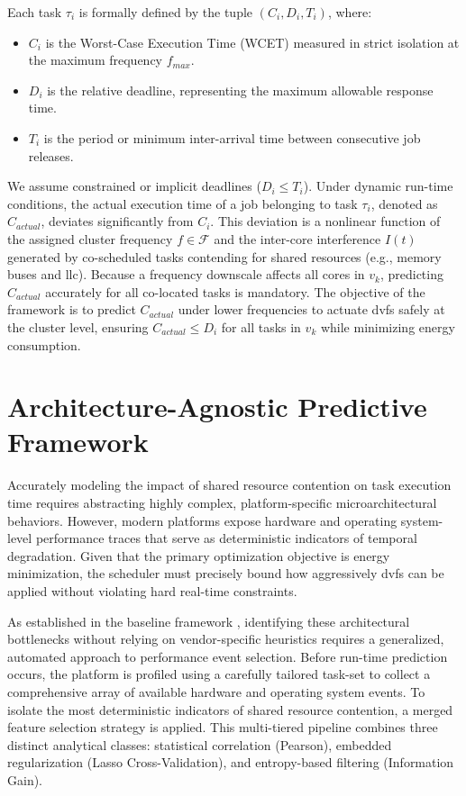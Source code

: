 \documentclass[conference]{IEEEtran}
\begin{document}
Each task $\tau_i$ is formally defined by the tuple $(C_i, D_i, T_i)$, where:
\begin{itemize}
    \item $C_i$ is the Worst-Case Execution Time (WCET) measured in strict isolation at the maximum frequency $f_{max}$.
    \item $D_i$ is the relative deadline, representing the maximum allowable response time.
    \item $T_i$ is the period or minimum inter-arrival time between consecutive job releases.
\end{itemize}

We assume constrained or implicit deadlines ($D_i \le T_i$). Under dynamic run-time conditions, the actual execution time of a job belonging to task $\tau_i$, denoted as $C_{actual}$, deviates significantly from $C_i$. This deviation is a nonlinear function of the assigned cluster frequency $f \in \mathcal{F}$ and the inter-core interference $I(t)$ generated by co-scheduled tasks contending for shared resources (e.g., memory buses and \gls{llc}). Because a frequency downscale affects all cores in $v_k$, predicting $C_{actual}$ accurately for all co-located tasks is mandatory. The objective of the framework is to predict $C_{actual}$ under lower frequencies to actuate \gls{dvfs} safely at the cluster level, ensuring $C_{actual} \le D_i$ for all tasks in $v_k$ while minimizing energy consumption.

\section{Architecture-Agnostic Predictive Framework}
Accurately modeling the impact of shared resource contention on task execution time requires abstracting highly complex, platform-specific microarchitectural behaviors. However, modern platforms expose hardware and operating system-level performance traces that serve as deterministic indicators of temporal degradation. Given that the primary optimization objective is energy minimization, the scheduler must precisely bound how aggressively \gls{dvfs} can be applied without violating hard real-time constraints.

As established in the baseline framework \cite{hoffmann2021online}, identifying these architectural bottlenecks without relying on vendor-specific heuristics requires a generalized, automated approach to performance event selection. Before run-time prediction occurs, the platform is profiled using a carefully tailored task-set to collect a comprehensive array of available hardware and operating system events. To isolate the most deterministic indicators of shared resource contention, a merged feature selection strategy is applied. This multi-tiered pipeline combines three distinct analytical classes: statistical correlation (Pearson), embedded regularization (Lasso Cross-Validation), and entropy-based filtering (Information Gain). 
\end{document}
